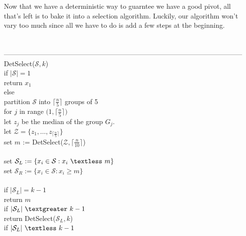 \documentclass{article}
\newcommand{\lt}{\textless}
\newcommand{\gt}{\textgreater}
\newcommand{\ceil}[1]{\lceil #1 \rceil}
\begin{document}
Now that we have a deterministic way to guarntee we have a good pivot, all that's left is to bake it into a selection algorithm. Luckily, our algorithm won't vary too much since all we have to do is add a few steps at the beginning.\\\\\\
---------------------------------------------------------------------------------------------------------
DetSelect($\mathcal{S}, k$)\\
	\hspace*{7mm} if $|\mathcal{S}| = 1$\\
	\hspace*{14mm} return $x_1$\\
	\hspace*{7mm} else\\
	\hspace*{14mm} partition $\mathcal{S}$ into $\ceil{\frac{n}{5}}$ groups of 5\\
	\hspace*{14mm} for $j$ in range $\big(1, \ceil{\frac{n}{5}}\big)$\\
	\hspace*{21mm} let $z_j$ be the median of the group $G_j$.\\
	\hspace*{14mm} let $\mathcal{Z} = \{z_1, \dots, z_{\ceil{\frac{n}{5}}}\}$\\
	\hspace*{14mm} set $m$ := DetSelect\big($\mathcal{Z}, \ceil{\frac{n}{10}}$\big)\\\\
	\hspace*{14mm} set $\mathcal{S}_L := \{x_i \in \mathcal{S} : x_i\ \lt\ m\}$\\
	\hspace*{14mm} set $\mathcal{S}_R := \{x_i \in \mathcal{S} : x_i \geq m\}$\\\\
	\hspace*{14mm} if $|\mathcal{S}_L| = k-1$\\
	\hspace*{21mm} return $m$\\
	\hspace*{14mm} if $|\mathcal{S}_L|\ \gt\ k-1$\\
	\hspace*{21mm} return DetSelect($\mathcal{S}_L, k$)\\
	\hspace*{14mm} if $|\mathcal{S}_L|\ \lt\ k-1$\\
\end{document}
